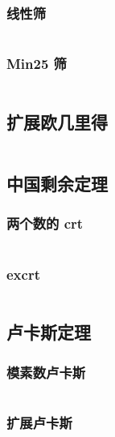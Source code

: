 \documentclass[a4paper, twoside]{article}
\begin{document}
\begin{multicols}{2}
				\subsubsection{线性筛}
					\inputminted{cpp}{../src-midori/number/线性筛.cpp}
				\subsubsection{Min25 筛}
					\inputminted{cpp}{../src-midori/number/min25.cpp}

			\subsection{扩展欧几里得}
				\inputminted{cpp}{../src-midori/number/exgcd.cpp}

			\subsection{中国剩余定理}
				\subsubsection{两个数的 crt}
					\inputminted{cpp}{../src-midori/number/两个数的crt.cpp}
				\subsubsection{excrt}
					\inputminted{cpp}{../src-midori/number/excrt.cpp}
			
			\subsection{卢卡斯定理}
				\subsubsection{模素数卢卡斯}
					\inputminted{cpp}{../src-midori/number/lucas.cpp}
				\subsubsection{扩展卢卡斯}
					\inputminted{cpp}{../src-midori/number/exlucas.cpp}
			

\end{multicols}
\end{document}
